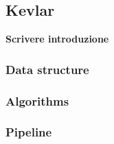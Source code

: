 \documentclass[../main.tex]{subfiles}
\begin{document}
\subsection{Kevlar}

\textbf{Scrivere introduzione}

\subsubsection{Data structure}
\subsubsection{Algorithms}
\subsubsection{Pipeline}
\end{document}
